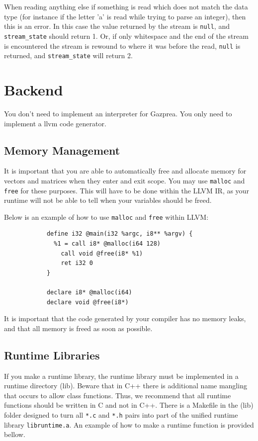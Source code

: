 \documentclass{article}
\begin{document}
		When reading anything else if something is read which does not match the data type (for instance if the letter
		'a' is read while trying to parse an integer), then this is an error. In this case the value returned by the
		stream is \texttt{null}, and \texttt{stream\_state} should return 1. Or, if only whitespace and the end of the
		stream is encountered the stream is rewound to where it was before the read, \texttt{null} is returned, and
		\texttt{stream\_state} will return 2.


\section{Backend}

	You don't need to implement an interpreter for Gazprea. You only need to implement a llvm code generator.

	\subsection{Memory Management}\label{sec:memory}
		 It is important that you are able to automatically free and allocate memory for vectors and matrices when they enter and exit scope.
		 You may use \texttt{malloc} and \texttt{free} for these purposes. This will have to be done within the LLVM IR, as your runtime will
		 not be able to tell when your variables should be freed.

		 Below is an example of how to use \texttt{malloc} and \texttt{free} within LLVM:

		 \begin{lstlisting}
			define i32 @main(i32 %argc, i8** %argv) {
			  %1 = call i8* @malloc(i64 128)
				call void @free(i8* %1)
				ret i32 0
			}

			declare i8* @malloc(i64)
			declare void @free(i8*)
		\end{lstlisting}
		It is important that the code generated by your compiler has no memory leaks, and that all memory is freed as soon as possible.

	\subsection{Runtime Libraries} %

		If you make a runtime library, the runtime library must be implemented in a runtime directory (lib). Beware that in C++ there is additional name
		mangling that occurs to allow class functions. Thus, we recommend that all runtime functions should be written in C and not in C++. There is a
		Makefile in the (lib) folder designed to turn all \texttt{*.c} and \texttt{*.h} pairs into part of the unified runtime library
		\texttt{libruntime.a}. An example of how to make a runtime function is provided bellow.
\end{document}
